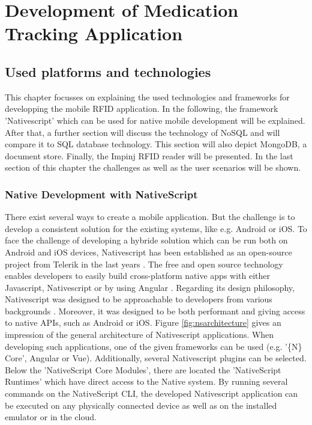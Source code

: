\chapter{Development of Medication Tracking Application}
\label{Kap3}

\section{Used platforms and technologies} \label{platforms}

This chapter focusses on explaining the used technologies and frameworks for developping the mobile RFID application. In the following, the framework 'Nativescript' which can be used for native mobile development will be explained. After that, a further section will discuss the technology of NoSQL and will compare it to SQL database technology. This section will also depict MongoDB, a document store. Finally, the Impinj RFID reader will be presented. In the last section \pageref{app_development} of this chapter the challenges as well as the user scenarios will be shown. 

\subsection{Native Development with NativeScript} 

There exist several ways to create a mobile application. But the challenge is to develop a consistent solution for the existing systems, like e.g. Android or iOS.
To face the challenge of developing a hybride solution which can be run both on Android and iOS devices, Nativescript has been established as an open-source project from Telerik in the last years \cite{nativescript}. The free and open source technology enables developers to easily build cross-platform native apps with either Javascript, Nativescript or by using Angular \cite{nativescript}. 
Regarding its design philosophy, Nativescript was designed to be approachable to developers from various backgrounds \cite{nativescript}. Moreover, it was designed to be both performant and giving access to native APIs, such as Android or iOS.
Figure \ref{fig:nsarchitecture} gives an impression of the general architecture of Nativescript applications. When developing such applications, one of the given frameworks can be used (e.g. '\{N\} Core', Angular or Vue). Additionally, several Nativescript plugins can be selected. Below the 'NativeScript Core Modules', there are located the 'NativeScript Runtimes' which have direct access to the Native system. By running several commands on the NativeScript \ac{CLI}, the developed Nativescript application can be executed on any physically connected device as well as on the installed emulator or in the cloud. 

